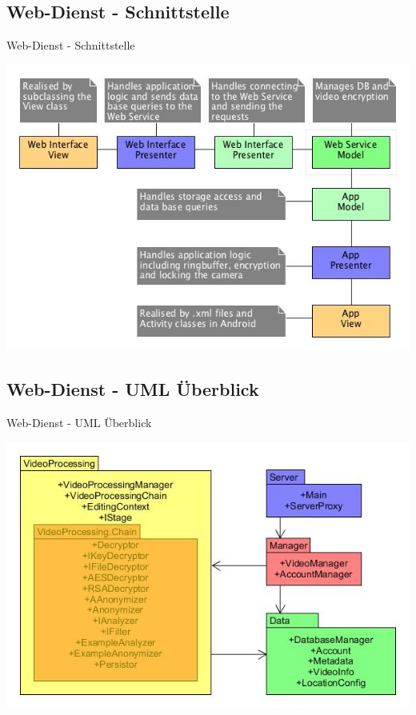 \documentclass[19pt]{beamer}
\begin{document}
\subsection{Web-Dienst - Schnittstelle}
\begin{frame}{Web-Dienst - Schnittstelle}
\begin{center}
\includegraphics[scale=0.3]{resources/overview_mvp.jpg}
\end{center}
\end{frame}
\subsection{Web-Dienst - UML \"{U}berblick}
\begin{frame}{Web-Dienst - UML \"{U}berblick}
\begin{center}
\includegraphics[scale=0.5]{resources/modules_overview.jpg}
\end{center}
\end{frame}
\end{document}
